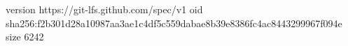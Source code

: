 version https://git-lfs.github.com/spec/v1
oid sha256:f2b301d28a10987aa3ae1c4df5c559dabae8b39e8386fc4ac8443299967f094e
size 6242
